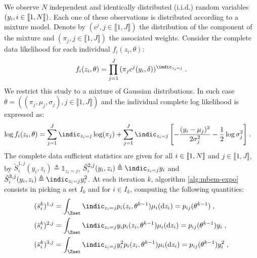 \documentclass[11pt]{article}
\theoremstyle{plain}
\begin{document}
\clearpage 
\begin{exmp}
We observe $N$ independent and identically distributed (i.i.d.) random variables $ (y_i, i \in \llbracket1,N\rrbracket)$. Each one of these observations is distributed according to a mixture model. Denote by $(c^j, j \in \llbracket 1, J \rrbracket)$ the distribution of the component of the mixture and $(\pi_j, j \in \llbracket 1, J \rrbracket)$ the associated weights. Consider the complete data likelihood for each individual $f_i( z_i, \theta)$:
\begin{align} \label{eq1}
f_i( z_i, \theta) = \prod_{j=1}^{J}{(\pi_j c^j(y_i,\delta))^{\indic_{z_i=j}}}\eqs.
\end{align}
We restrict this study to a mixture of Gaussian distributions. In such case $\theta = ((\pi_j, \mu_j, \sigma_j), j \in \llbracket 1, J \rrbracket)$ and the individual complete log likelihood is expressed as:
\begin{align}
\log f_i( z_i, \theta) & = \sum_{j=1}^{J}{\indic_{z_i=j}\log(\pi_j)} + \sum_{j=1}^{J}{\indic_{z_i=j}\left[-\frac{(y_i - \mu_j)^2}{2\sigma^2_j} - \frac{1}{2}\log \sigma^2_j\right]}\eqs.
\end{align}
The complete data sufficient statistics are given for all $i \in \llbracket1,N\rrbracket$ and $j \in \llbracket1,J\rrbracket$, by $\tilde{S}_i^{1,j}(y_i,z_i) \triangleq \mathbb{1}_{z_i=j}$, $\tilde{S}_i^{2,j}(y_i,z_i) \triangleq \indic_{z_i=j}y_i$ and $\tilde{S}_i^{3,j}(y_i,z_i) \triangleq \indic_{z_i=j}y_i^2$.
At each iteration $k$, algorithm \ref{alg:mbem-expo} consists in picking a set $I_k$ and for $i \in I_k$, computing the following quantities:
\begin{align}
& (\bar{s}_i^k)^{1,j} = \int_{\Zset}{\indic_{z_i=j}p_i(z_i,\theta^{k-1}) \mu_i(\dz_i)} = p_{ij}(\theta^{k-1})\eqs,\\
& (\bar{s}_i^k)^{2,j} = \int_{\Zset}{\indic_{z_i=j}y_ip_i(z_i,\theta^{k-1}) \mu_i(\dz_i)} = p_{ij}(\theta^{k-1})y_i\eqs,\\
& (\bar{s}_i^k)^{3,j} = \int_{\Zset}{\indic_{z_i=j}y_i^2p_i(z_i,\theta^{k-1}) \mu_i(\dz_i)} = p_{ij}(\theta^{k-1})y_i^2\eqs,
\end{align}

\end{exmp}
\end{document}
